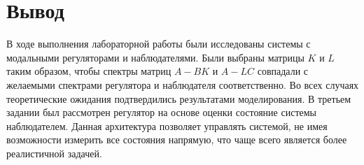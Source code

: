 
\FloatBarrier

\FloatBarrier

\FloatBarrier

\FloatBarrier

\section{Вывод}
В ходе выполнения лабораторной работы были исследованы системы с модальными регуляторами и наблюдателями.
Были выбраны матрицы $K$ и $L$ таким образом, чтобы спектры матриц $A - BK$ и $A - LC$ совпадали с желаемыми спектрами регулятора и наблюдателя соответственно.
Во всех случаях теоретические ожидания подтвердились результатами моделирования. В третьем задании был рассмотрен регулятор на основе оценки 
состояние системы наблюдателем. Данная архитектура позволяет управлять системой, не имея возможности измерить все состояния напрямую, что 
чаще всего является более реалистичной задачей.